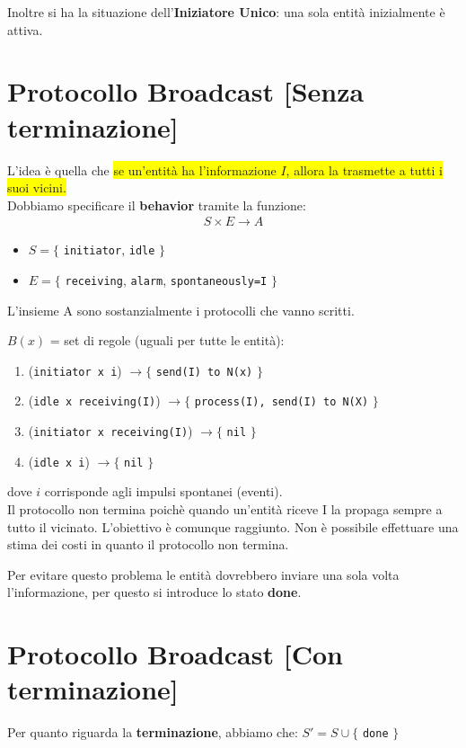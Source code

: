 Inoltre si ha la situazione dell'\textbf{Iniziatore Unico}: una sola entità inizialmente è attiva.

\section{Protocollo Broadcast [Senza terminazione]}
L'idea è quella che \colorbox{yellow}{se un'entità ha l'informazione $I$, allora la trasmette a tutti i suoi vicini.} \\ Dobbiamo specificare il \textbf{behavior} tramite la funzione:
\begin{eqnarray}
  S \times E \rightarrow A
  \nonumber
\end{eqnarray}
\begin{itemize}
  \item $S=\lbrace$ \texttt{initiator}, \texttt{idle} $\rbrace$
  \item $E=\lbrace$ \texttt{receiving}, \texttt{alarm}, \texttt{spontaneously=I} $\rbrace$
\end{itemize}

L'insieme A sono sostanzialmente i protocolli che vanno scritti.

$B(x)$ = set di regole (uguali per tutte le entità):
\begin{enumerate}
  \item (\texttt{initiator x i}) $\rightarrow \lbrace$ \texttt{send(I) to N(x)} $\rbrace$
  \item (\texttt{idle x receiving(I)}) $\rightarrow \lbrace$ \texttt{process(I), send(I) to N(X)} $\rbrace$
  \item (\texttt{initiator x receiving(I)}) $\rightarrow \lbrace$ \texttt{nil} $\rbrace$
  \item (\texttt{idle x i}) $\rightarrow \lbrace$ \texttt{nil} $\rbrace$
\end{enumerate}
dove \textbf{$i$} corrisponde agli impulsi spontanei (eventi).\\

Il protocollo non termina poichè quando un'entità riceve I la propaga sempre a tutto il vicinato. L'obiettivo è comunque raggiunto. Non è possibile effettuare una stima dei costi in quanto il protocollo non termina.

Per evitare questo problema le entità dovrebbero inviare una sola volta l'informazione, per questo si introduce lo stato \textbf{done}.

\section{Protocollo Broadcast [Con terminazione]}
Per quanto riguarda la \textbf{terminazione}, abbiamo che:
$S' = S \cup \lbrace$ \texttt{done} $\rbrace$

